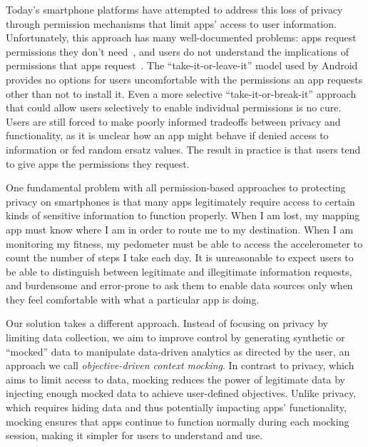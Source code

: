 Today's smartphone platforms have attempted to address this loss of privacy
through permission mechanisms that limit apps' access to user information.
Unfortunately, this approach has many well-documented problems: apps request
permissions they don't need~\cite{taintdroid-osdi,demystified-ccs11}, and
users do not understand the implications of permissions that apps
request~\cite{androidperms-soups12}. The ``take-it-or-leave-it'' model used
by Android provides no options for users uncomfortable with the permissions
an app requests other than not to install it. Even a more selective
``take-it-or-break-it'' approach~\cite{apex-asiaccs10} that could allow users
selectively to enable individual permissions is no cure.  Users are still
forced to make poorly informed tradeoffs between privacy and functionality,
as it is unclear how an app might behave if denied access to information or
fed random ersatz values. The result in practice is that users tend to give
apps the permissions they request.


One fundamental problem with all permission-based approaches to protecting
privacy on smartphones is that many apps legitimately require access to
certain kinds of sensitive information to function properly. When I am lost,
my mapping app must know where I am in order to route me to my
destination. When I am monitoring my fitness, my pedometer must be able to
access the accelerometer to count the number of steps I take each day. It is
unreasonable to expect users to be able to distinguish between legitimate and
illegitimate information requests, and burdensome and error-prone to ask them
to enable data sources only when they feel comfortable with what a particular
app is doing.

Our solution takes a different approach. Instead of focusing on privacy by limiting
data collection, we aim to improve control by generating synthetic or ``mocked''
data to manipulate data-driven analytics as directed by the user, an approach
we call \textit{objective-driven context mocking}. In contrast to privacy,
which aims to limit access to data, mocking reduces the power of legitimate
data by injecting enough mocked data to achieve user-defined objectives.
Unlike privacy, which requires hiding data and thus potentially impacting apps'
functionality, mocking ensures that apps continue to function normally
during each mocking session, making it simpler for users to understand and
use.

